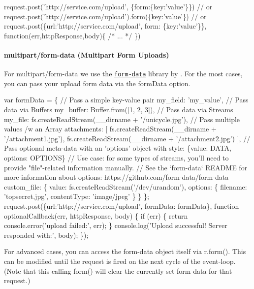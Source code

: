 \begin{DoxyCode}
request.post('http://service.com/upload', \{form:\{key:'value'\}\})
// or
request.post('http://service.com/upload').form(\{key:'value'\})
// or
request.post(\{url:'http://service.com/upload', form: \{key:'value'\}\}, function(err,httpResponse,body)\{ /*
       ... */ \})
\end{DoxyCode}


\paragraph*{multipart/form-\/data (Multipart Form Uploads)}

For {\ttfamily multipart/form-\/data} we use the \href{https://github.com/form-data/form-data}{\tt form-\/data} library by \href{https://github.com/felixge}{\tt }. For the most cases, you can pass your upload form data via the {\ttfamily form\+Data} option.


\begin{DoxyCode}
var formData = \{
  // Pass a simple key-value pair
  my\_field: 'my\_value',
  // Pass data via Buffers
  my\_buffer: Buffer.from([1, 2, 3]),
  // Pass data via Streams
  my\_file: fs.createReadStream(\_\_dirname + '/unicycle.jpg'),
  // Pass multiple values /w an Array
  attachments: [
    fs.createReadStream(\_\_dirname + '/attachment1.jpg'),
    fs.createReadStream(\_\_dirname + '/attachment2.jpg')
  ],
  // Pass optional meta-data with an 'options' object with style: \{value: DATA, options: OPTIONS\}
  // Use case: for some types of streams, you'll need to provide "file"-related information manually.
  // See the `form-data` README for more information about options: https://github.com/form-data/form-data
  custom\_file: \{
    value:  fs.createReadStream('/dev/urandom'),
    options: \{
      filename: 'topsecret.jpg',
      contentType: 'image/jpeg'
    \}
  \}
\};
request.post(\{url:'http://service.com/upload', formData: formData\}, function optionalCallback(err,
       httpResponse, body) \{
  if (err) \{
    return console.error('upload failed:', err);
  \}
  console.log('Upload successful!  Server responded with:', body);
\});
\end{DoxyCode}


For advanced cases, you can access the form-\/data object itself via {\ttfamily r.\+form()}. This can be modified until the request is fired on the next cycle of the event-\/loop. (Note that this calling {\ttfamily form()} will clear the currently set form data for that request.)


